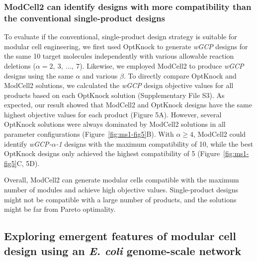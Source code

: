 \subsubsection{ModCell2 can identify designs with more compatibility than
the conventional single-product designs}
To evaluate if the
conventional, single-product design strategy is suitable for modular
cell engineering, we first used OptKnock to generate \emph{wGCP} designs
for the same 10 target molecules independently with various allowable
reaction deletions (\(\alpha = 2,\ 3,\ \ldots,\ 7\)). Likewise, we
employed ModCell2 to produce \emph{wGCP} designs using the same
\(\alpha\) and various \(\beta\). To directly compare OptKnock and
ModCell2 solutions, we calculated the \emph{wGCP} design objective
values for all products based on each OptKnock solution (Supplementary
File S3). As expected, our result showed that ModCell2 and OptKnock
designs have the same highest objective values for each product (Figure
5A). However, several OptKnock solutions were always dominated by
ModCell2 solutions in all parameter configurations (Figure~\ref{fig:ms1-fig5}B). With
\(\alpha \geq 4\), ModCell2 could identify
\emph{wGCP-}\(\alpha\)\emph{-1} designs with the maximum compatibility
of 10, while the best OptKnock designs only achieved the highest
compatibility of 5 (Figure~\ref{fig:ms1-fig5}C, 5D).

Overall, ModCell2 can generate modular cells compatible with the maximum number of modules and achieve high objective values.
Single-product designs might not be compatible with a large number of products, and the solutions might be far from Pareto optimality.

\subsection{Exploring emergent features of modular cell design using an \textit{E. coli} genome-scale network}

